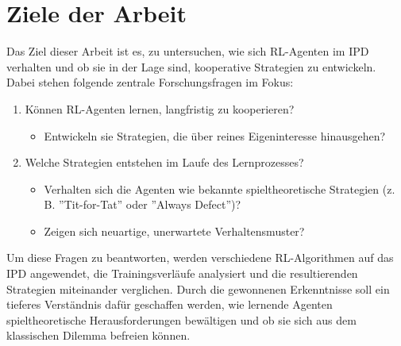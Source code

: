 \section{Ziele der Arbeit}
Das Ziel dieser Arbeit ist es, zu untersuchen, wie sich RL-Agenten im IPD verhalten
und ob sie in der Lage sind, kooperative Strategien zu entwickeln. Dabei stehen 
folgende zentrale Forschungsfragen im Fokus:
\begin{enumerate}
    \item Können RL-Agenten lernen, langfristig zu kooperieren?
        \begin{itemize}
            \item Entwickeln sie Strategien, die über reines Eigeninteresse hinausgehen?
        \end{itemize}
    \item Welche Strategien entstehen im Laufe des Lernprozesses?
        \begin{itemize}
            \item Verhalten sich die Agenten wie bekannte spieltheoretische Strategien (z. B. ''Tit-for-Tat'' oder ''Always Defect'')?
            \item Zeigen sich neuartige, unerwartete Verhaltensmuster?
        \end{itemize}

\end{enumerate}
Um diese Fragen zu beantworten, werden verschiedene RL-Algorithmen auf das IPD 
angewendet, die Trainingsverläufe analysiert und die resultierenden Strategien 
miteinander verglichen. Durch die gewonnenen Erkenntnisse soll ein tieferes Verständnis 
dafür geschaffen werden, wie lernende Agenten spieltheoretische Herausforderungen 
bewältigen und ob sie sich aus dem klassischen Dilemma befreien können.